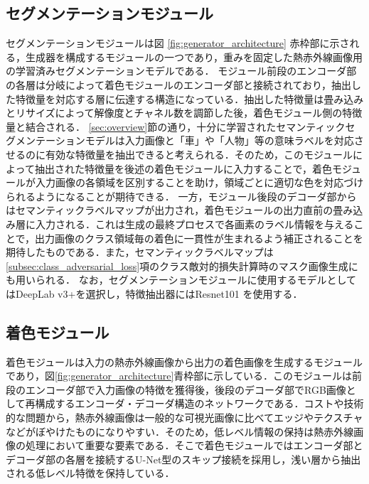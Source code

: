 \documentclass[11pt,dvipdfmx]{ujreport}
\begin{document}
\subsection{セグメンテーションモジュール}
\label{subsec:segmentation_module}
セグメンテーションモジュールは図 \ref{fig:generator_architecture} 赤枠部に示される，生成器を構成するモジュールの一つであり，重みを固定した熱赤外線画像用の学習済みセグメンテーションモデルである．
モジュール前段のエンコーダ部の各層は分岐によって着色モジュールのエンコーダ部と接続されており，抽出した特徴量を対応する層に伝達する構造になっている．抽出した特徴量は畳み込みとリサイズによって解像度とチャネル数を調節した後，着色モジュール側の特徴量と結合される．
\ref{sec:overview}節の通り，十分に学習されたセマンティックセグメンテーションモデルは入力画像と「車」や「人物」等の意味ラベルを対応させるのに有効な特徴量を抽出できると考えられる．そのため，このモジュールによって抽出された特徴量を後述の着色モジュールに入力することで，着色モジュールが入力画像の各領域を区別することを助け，領域ごとに適切な色を対応づけられるようになることが期待できる．
一方，モジュール後段のデコーダ部からはセマンティックラベルマップが出力され，着色モジュールの出力直前の畳み込み層に入力される．これは生成の最終プロセスで各画素のラベル情報を与えることで，出力画像のクラス領域毎の着色に一貫性が生まれるよう補正されることを期待したものである．また，セマンティックラベルマップは\ref{subsec:class_adversarial_loss}項のクラス敵対的損失計算時のマスク画像生成にも用いられる．
なお，セグメンテーションモジュールに使用するモデルとしてはDeepLab v3+を選択し，特徴抽出器にはResnet101 \cite{He_2015_CVPR_Resnet} を使用する．\par

\subsection{着色モジュール}
\label{subsec:colorization_module}
着色モジュールは入力の熱赤外線画像から出力の着色画像を生成するモジュールであり，図\ref{fig:generator_architecture}青枠部に示している．このモジュールは前段のエンコーダ部で入力画像の特徴を獲得後，後段のデコーダ部でRGB画像として再構成するエンコーダ・デコーダ構造のネットワークである．コストや技術的な問題から，熱赤外線画像は一般的な可視光画像に比べてエッジやテクスチャなどがぼやけたものになりやすい．そのため，低レベル情報の保持は熱赤外線画像の処理において重要な要素である．そこで着色モジュールではエンコーダ部とデコーダ部の各層を接続するU-Net型のスキップ接続を採用し，浅い層から抽出される低レベル特徴を保持している．
\end{document}
